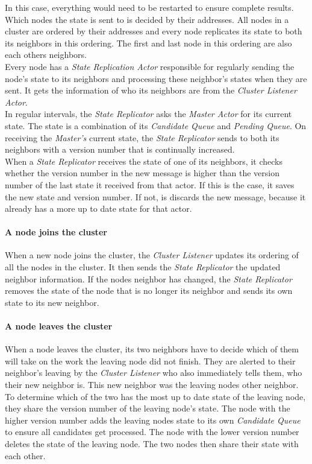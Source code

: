   In this case, everything would need to be restarted to ensure complete results. \\
  Which nodes the state is sent to is decided by their addresses.
  All nodes in a cluster are ordered by their addresses and every node replicates its state to both its neighbors in this ordering.
  The first and last node in this ordering are also each others neighbors.\\
  Every node has a \emph{State Replication Actor} responsible for regularly sending the node's state to its neighbors and processing these neighbor's states when they are sent.
  It gets the information of who its neighbors are from the \emph{Cluster Listener Actor}. \\
  In regular intervals, the \emph{State Replicator} asks the \emph{Master Actor} for its current state.
  The state is a combination of its \emph{Candidate Queue} and \emph{Pending Queue}.
  On receiving the \emph{Master's} current state, the \emph{State Replicator} sends to both its neighbors with a version number that is continually increased.\\
  When a \emph{State Replicator} receives the state of one of its neighbors, it checks whether the version number in the new message is higher than the version number of the last state it received from that actor.
  If this is the case, it saves the new state and version number.
  If not, is discards the new message, because it already has a more up to date state for that actor.

  \paragraph{A node joins the cluster}
  When a new node joins the cluster, the \emph{Cluster Listener} updates its ordering of all the nodes in the cluster. 
  It then sends the \emph{State Replicator} the updated neighbor information.
  If the nodes neighbor has changed, the \emph{State Replicator} removes the state of the node that is no longer its neighbor and sends its own state to its new neighbor.
  
  \paragraph{A node leaves the cluster}
  When a node leaves the cluster, its two neighbors have to decide which of them will take on the work the leaving node did not finish.
  They are alerted to their neighbor's leaving by the \emph{Cluster Listener} who also immediately tells them, who their new neighbor is.
  This new neighbor was the leaving nodes other neighbor.
  To determine which of the two has the most up to date state of the leaving node, they share the version number of the leaving node's state. 
  The node with the higher version number adds the leaving nodes state to its own \emph{Candidate Queue} to ensure all candidates get processed. 
  The node with the lower version number deletes the state of the leaving node.
  The two nodes then share their state with each other. 